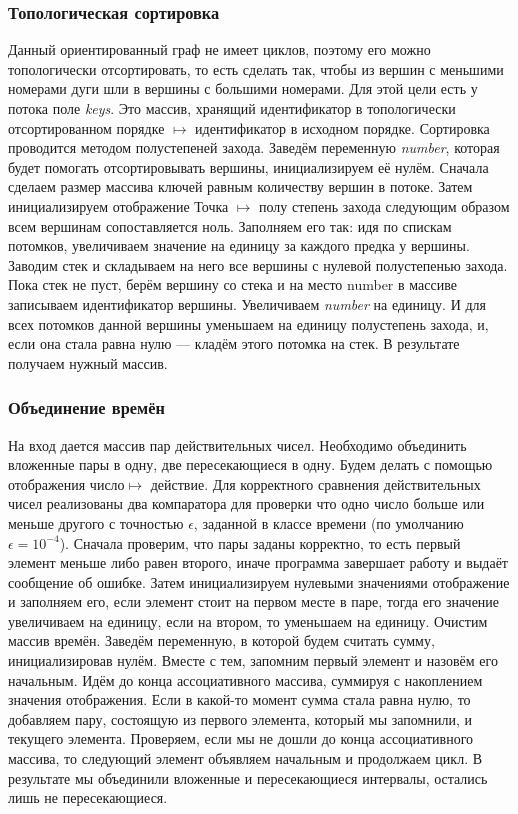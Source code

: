 \documentclass[12pt, a4 paper]{article}
\theoremstyle{plain}
\begin{document}


\subsubsection{Топологическая сортировка}

Данный ориентированный граф не имеет циклов, поэтому его можно топологически отсортировать, то есть сделать так, чтобы из вершин с меньшими номерами дуги шли в вершины с большими номерами. Для этой цели есть у потока поле \textit{keys}. Это массив, хранящий идентификатор в топологически отсортированном порядке $\mapsto$ идентификатор в исходном порядке. Сортировка проводится методом полустепеней захода. Заведём переменную \textit{number}, которая будет помогать отсортировывать вершины, инициализируем её нулём. Сначала сделаем размер массива ключей равным количеству вершин в потоке. Затем инициализируем отображение Точка $\mapsto$ полу степень захода следующим образом всем вершинам сопоставляется ноль. Заполняем его так: идя по спискам потомков, увеличиваем значение на единицу за каждого предка у вершины. Заводим стек и складываем на него все вершины с нулевой полустепенью захода. Пока стек не пуст, берём вершину со стека и на место number в массиве записываем идентификатор вершины. Увеличиваем \textit{number} на единицу. И для всех потомков данной вершины уменьшаем на единицу полустепень захода, и, если она стала равна нулю --- кладём этого потомка на стек. В результате получаем нужный массив.




\subsubsection{Объединение времён}

На вход дается массив пар действительных чисел. Необходимо объединить вложенные пары в одну, две пересекающиеся в одну. Будем делать с помощью отображения число$\mapsto$ действие. Для корректного сравнения действительных чисел реализованы два компаратора для проверки что одно число больше или меньше другого с точностью $\epsilon$, заданной в классе времени (по умолчанию $\epsilon = 10^{-4}$). Сначала проверим, что пары заданы корректно, то есть первый элемент меньше либо равен второго, иначе программа завершает работу и выдаёт сообщение об ошибке. Затем инициализируем нулевыми значениями отображение и заполняем его, если элемент стоит на первом месте в паре, тогда его значение увеличиваем на единицу, если на втором, то уменьшаем на единицу. Очистим массив времён. Заведём переменную, в которой будем считать сумму, инициализировав нулём. Вместе с тем, запомним первый элемент и назовём его начальным. Идём до конца ассоциативного массива, суммируя с накоплением значения отображения. Если в какой-то момент сумма стала равна нулю, то добавляем пару, состоящую из первого элемента, который мы запомнили, и текущего элемента. Проверяем, если мы не дошли до конца ассоциативного массива, то следующий элемент объявляем начальным и продолжаем цикл. В результате мы объединили вложенные и пересекающиеся интервалы, остались лишь не пересекающиеся.
\end{document}
